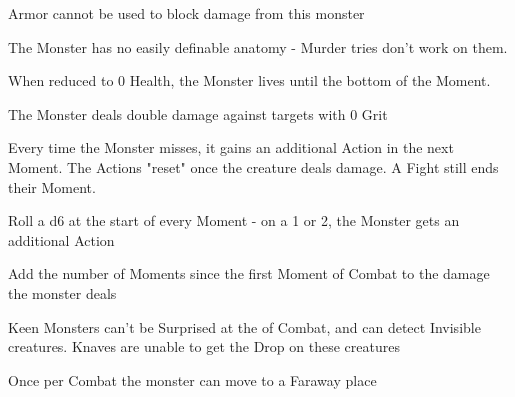 { 

%





 \newpage




Armor cannot be used to block damage from this monster


The Monster has no easily definable anatomy - Murder tries don't work on them.


When reduced to 0 Health, the Monster lives until the bottom of the  Moment.


The Monster deals double damage against targets with 0 Grit


Every time the Monster misses, it gains an additional Action in the next Moment.  The Actions "reset" once the creature deals damage. A Fight \RO still ends their Moment.


Roll a d6 at the start of every Moment - on a 1 or 2, the Monster gets an additional Action


Add the number of Moments since the first Moment of Combat to the damage the monster deals


Keen Monsters can't be Surprised at the   of Combat, and can detect Invisible creatures. Knaves are unable to get the Drop on these creatures


Once per Combat the monster can move to a Faraway place

}
